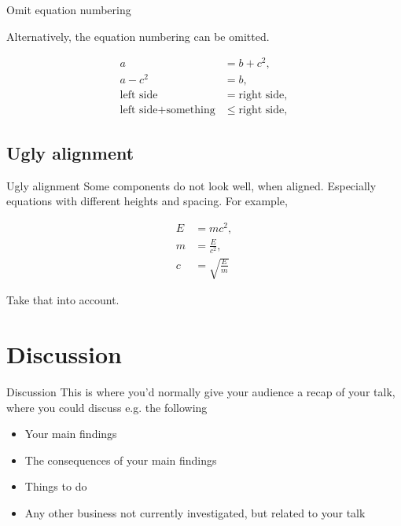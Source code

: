 \documentclass[aspectratio=169]{beamer}
\begin{document}
\begin{frame}{Omit equation numbering}

Alternatively, the equation numbering can be omitted.

\begin{align*}
a &= b + c^2, \\
a - c^2 &= b, \\
\text{left side} &= \text{right side}, \\
\text{left side} + \text{something} &\leq \text{right side},
\end{align*}

\end{frame}

\subsection{Ugly alignment}

\begin{frame}{Ugly alignment}
Some components do not look well, when aligned. Especially equations with different heights and spacing. For example,

\begin{align}
	E &= mc^2, \\
	m &= \frac{E}{c^2}, \\
	c &= \sqrt{\frac{E}{m}}
\end{align}

Take that into account.

\end{frame}

\section{Discussion}

\begin{frame}{Discussion}
This is where you'd normally give your audience a recap of your talk, where you could discuss e.g. the following
\begin{itemize}
\item{Your main findings}
\item{The consequences of your main findings}
\item{Things to do}
\item{Any other business not currently investigated, but related to your talk}
\end{itemize}
\end{frame}
\end{document}
